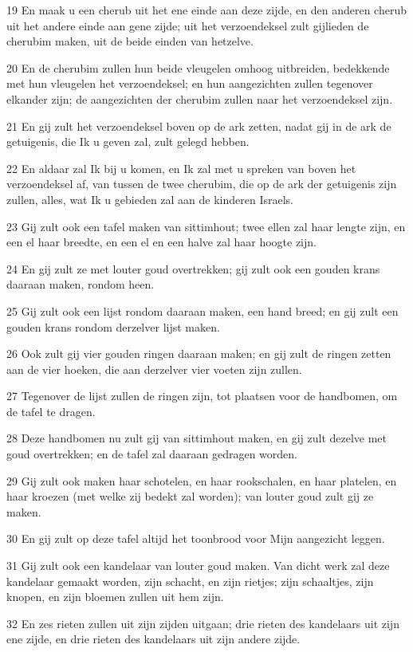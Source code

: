 \par 19 En maak u een cherub uit het ene einde aan deze zijde, en den anderen cherub uit het andere einde aan gene zijde; uit het verzoendeksel zult gijlieden de cherubim maken, uit de beide einden van hetzelve.
\par 20 En de cherubim zullen hun beide vleugelen omhoog uitbreiden, bedekkende met hun vleugelen het verzoendeksel; en hun aangezichten zullen tegenover elkander zijn; de aangezichten der cherubim zullen naar het verzoendeksel zijn.
\par 21 En gij zult het verzoendeksel boven op de ark zetten, nadat gij in de ark de getuigenis, die Ik u geven zal, zult gelegd hebben.
\par 22 En aldaar zal Ik bij u komen, en Ik zal met u spreken van boven het verzoendeksel af, van tussen de twee cherubim, die op de ark der getuigenis zijn zullen, alles, wat Ik u gebieden zal aan de kinderen Israels.
\par 23 Gij zult ook een tafel maken van sittimhout; twee ellen zal haar lengte zijn, en een el haar breedte, en een el en een halve zal haar hoogte zijn.
\par 24 En gij zult ze met louter goud overtrekken; gij zult ook een gouden krans daaraan maken, rondom heen.
\par 25 Gij zult ook een lijst rondom daaraan maken, een hand breed; en gij zult een gouden krans rondom derzelver lijst maken.
\par 26 Ook zult gij vier gouden ringen daaraan maken; en gij zult de ringen zetten aan de vier hoeken, die aan derzelver vier voeten zijn zullen.
\par 27 Tegenover de lijst zullen de ringen zijn, tot plaatsen voor de handbomen, om de tafel te dragen.
\par 28 Deze handbomen nu zult gij van sittimhout maken, en gij zult dezelve met goud overtrekken; en de tafel zal daaraan gedragen worden.
\par 29 Gij zult ook maken haar schotelen, en haar rookschalen, en haar platelen, en haar kroezen (met welke zij bedekt zal worden); van louter goud zult gij ze maken.
\par 30 En gij zult op deze tafel altijd het toonbrood voor Mijn aangezicht leggen.
\par 31 Gij zult ook een kandelaar van louter goud maken. Van dicht werk zal deze kandelaar gemaakt worden, zijn schacht, en zijn rietjes; zijn schaaltjes, zijn knopen, en zijn bloemen zullen uit hem zijn.
\par 32 En zes rieten zullen uit zijn zijden uitgaan; drie rieten des kandelaars uit zijn ene zijde, en drie rieten des kandelaars uit zijn andere zijde.
